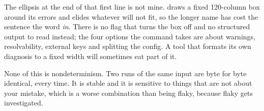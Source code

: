 %
The ellipsis at the end of that first line is not mine.  draws a
fixed 120-column box around its errors and elides whatever will not fit, so the
longer name has cost the sentence the word \emph{in}. There is no flag that
turns the box off and no structured output to read instead; the four options
the command takes are about warnings, resolvability, external keys and
splitting the config. A tool that formats its own diagnosis to a fixed width
will sometimes eat part of it.

%
None of this is nondeterminism. Two runs of the same input are byte for byte
identical, every time. It is stable and it is sensitive to things that are not
about your mistake, which is a worse combination than being flaky, because
flaky gets investigated.
%
